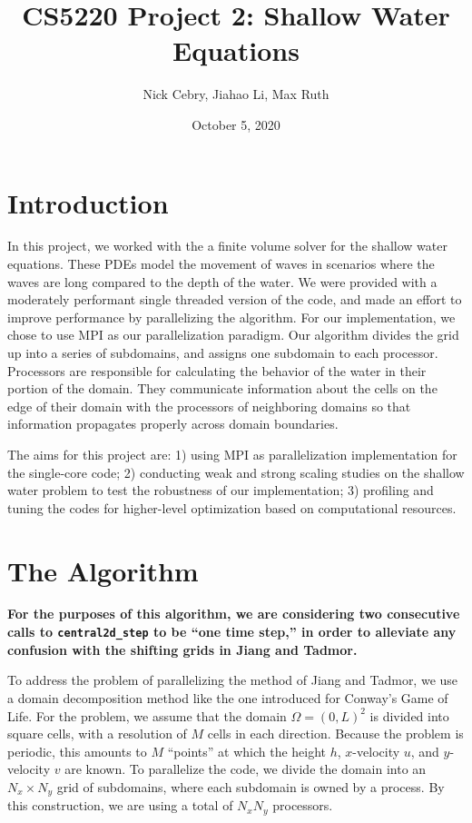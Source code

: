 \documentclass{article}
\title{CS5220 Project 2: Shallow Water Equations}
\author{Nick Cebry, Jiahao Li, Max Ruth}
\date{October 5, 2020}
\begin{document}
\maketitle

\section{Introduction}

In this project, we worked with the a finite volume solver for the shallow water equations. These PDEs model the movement of waves in scenarios where the waves are long compared to the depth of the water. We were provided with a moderately performant single threaded version of the code, and made an effort to improve performance by parallelizing the algorithm. For our implementation, we chose to use MPI as our parallelization paradigm. Our algorithm divides the grid up into a series of subdomains, and assigns one subdomain to each processor. Processors are responsible for calculating the behavior of the water in their portion of the domain. They communicate information about the cells on the edge of their domain with the processors of neighboring domains so that information propagates properly across domain boundaries.

The aims for this project are: 1) using MPI as parallelization implementation for the single-core code; 2) conducting weak and strong scaling studies on the shallow water problem to test the robustness of our implementation; 3) profiling and tuning the codes for higher-level optimization based on computational resources.

\section{The Algorithm}
\textbf{For the purposes of this algorithm, we are considering two consecutive calls to \texttt{central2d\_step} to be ``one time step,'' in order to alleviate any confusion with the shifting grids in Jiang and Tadmor.}

To address the problem of parallelizing the method of Jiang and Tadmor, we use a domain decomposition method like the one introduced for Conway's Game of Life. For the problem, we assume that the domain $\Omega = (0,L)^2$ is divided into square cells, with a resolution of $M$ cells in each direction. Because the problem is periodic, this amounts to $M$ ``points'' at which the height $h$, $x$-velocity $u$, and $y$-velocity $v$ are known. To parallelize the code, we divide the domain into an $N_x\times N_y$ grid of subdomains, where each subdomain is owned by a process. By this construction, we are using a total of $N_x N_y$ processors. 
\end{document}
